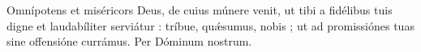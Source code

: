 Omnípotens et miséricors Deus, de cuius múnere venit, ut tibi a fidélibus tuis digne et laudabíliter serviátur : tríbue, quǽsumus, nobis ; ut ad promissiónes tuas sine offensióne currámus. Per Dóminum nostrum.
